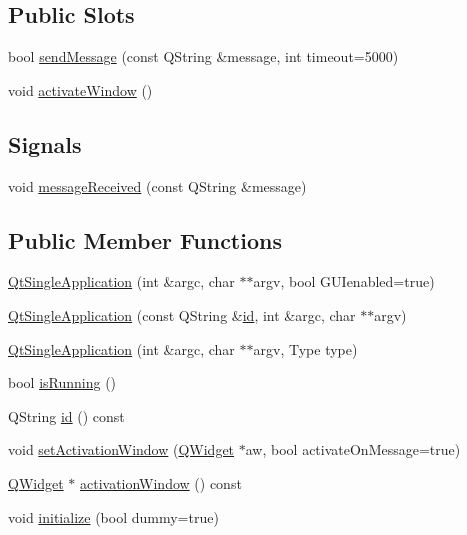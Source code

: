 \subsection*{Public Slots}
\begin{DoxyCompactItemize}
\item 
bool \hyperlink{class_qt_single_application_a0e2f3900f0290913c738ec6b4b959922}{send\-Message} (const Q\-String \&message, int timeout=5000)
\item 
void \hyperlink{class_qt_single_application_a0881b32c76132b499f3180064006abc1}{activate\-Window} ()
\end{DoxyCompactItemize}
\subsection*{Signals}
\begin{DoxyCompactItemize}
\item 
void \hyperlink{class_qt_single_application_a69340cef3d26d026e11424930e5a5866}{message\-Received} (const Q\-String \&message)
\end{DoxyCompactItemize}
\subsection*{Public Member Functions}
\begin{DoxyCompactItemize}
\item 
\hyperlink{class_qt_single_application_afe5e96d236e42949e65669eca282acbd}{Qt\-Single\-Application} (int \&argc, char $\ast$$\ast$argv, bool G\-U\-Ienabled=true)
\item 
\hyperlink{class_qt_single_application_a746192779985e28f22fd17766884518e}{Qt\-Single\-Application} (const Q\-String \&\hyperlink{class_qt_single_application_affd094410862f30fce83afcba3457b19}{id}, int \&argc, char $\ast$$\ast$argv)
\item 
\hyperlink{class_qt_single_application_adcb7a28eec3eef34c6474fb419509895}{Qt\-Single\-Application} (int \&argc, char $\ast$$\ast$argv, Type type)
\item 
bool \hyperlink{class_qt_single_application_aa9f0e6e4f18ac79bbb7a955cd860894d}{is\-Running} ()
\item 
Q\-String \hyperlink{class_qt_single_application_affd094410862f30fce83afcba3457b19}{id} () const 
\item 
void \hyperlink{class_qt_single_application_acb5347f6dc6822dbe4d6a78804043528}{set\-Activation\-Window} (\hyperlink{class_q_widget}{Q\-Widget} $\ast$aw, bool activate\-On\-Message=true)
\item 
\hyperlink{class_q_widget}{Q\-Widget} $\ast$ \hyperlink{class_qt_single_application_a1e6be5adba2282fcfe547596b2aee18a}{activation\-Window} () const 
\item 
void \hyperlink{class_qt_single_application_a622807c60657c1a1fadec15ea5903b47}{initialize} (bool dummy=true)
\end{DoxyCompactItemize}


